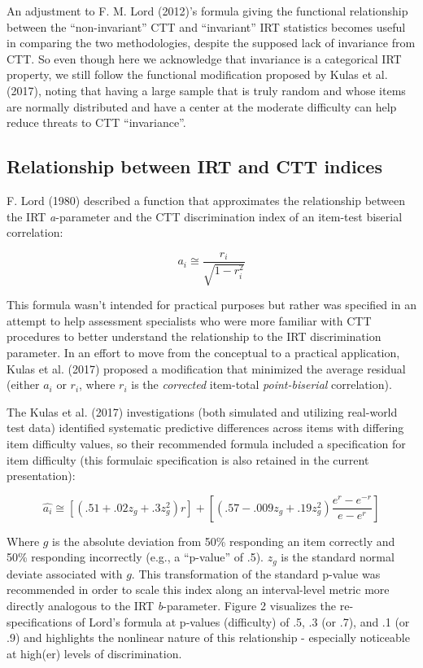 \documentclass[
  man]{apa6}
\begin{document}
An adjustment to F. M. Lord (2012)'s formula giving the functional relationship between the ``non-invariant'' CTT and ``invariant'' IRT statistics becomes useful in comparing the two methodologies, despite the supposed lack of invariance from CTT. So even though here we acknowledge that invariance is a categorical IRT property, we still follow the functional modification proposed by Kulas et al. (2017), noting that having a large sample that is truly random and whose items are normally distributed and have a center at the moderate difficulty can help reduce threats to CTT ``invariance''.

\hypertarget{relationship-between-irt-and-ctt-indices}{%
\subsection{Relationship between IRT and CTT indices}\label{relationship-between-irt-and-ctt-indices}}

F. Lord (1980) described a function that approximates the relationship between the IRT \emph{a}-parameter and the CTT discrimination index of an item-test biserial correlation:

\[a_i\cong \frac{r_i}{\sqrt{1-r_i^2}}\]

This formula wasn't intended for practical purposes but rather was specified in an attempt to help assessment specialists who were more familiar with CTT procedures to better understand the relationship to the IRT discrimination parameter. In an effort to move from the conceptual to a practical application, Kulas et al. (2017) proposed a modification that minimized the average residual (either \(a_i\) or \(r_i\), where \(r_i\) is the \emph{corrected} item-total \emph{point-biserial} correlation).

The Kulas et al. (2017) investigations (both simulated and utilizing real-world test data) identified systematic predictive differences across items with differing item difficulty values, so their recommended formula included a specification for item difficulty (this formulaic specification is also retained in the current presentation):

\[\hat{a_i}\cong[(.51 + .02z_g + .3z_g^2)r]+[(.57 - .009z_g + .19z_g^2)\frac{e^r-e^{-r}}{e-e^r}]\]

Where \(g\) is the absolute deviation from 50\% responding an item correctly and 50\% responding incorrectly (e.g., a ``p-value'' of .5). \(z_g\) is the standard normal deviate associated with \(g\). This transformation of the standard p-value was recommended in order to scale this index along an interval-level metric more directly analogous to the IRT \emph{b}-parameter. Figure 2 visualizes the re-specifications of Lord's formula at p-values (difficulty) of .5, .3 (or .7), and .1 (or .9) and highlights the nonlinear nature of this relationship - especially noticeable at high(er) levels of discrimination.
\end{document}
